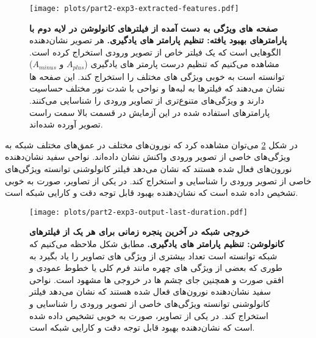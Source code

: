                 \begin{figure}[!ht]
                    \centering
                    \texttt{[image: plots/part2-exp3-extracted-features.pdf]} 
                    \captionsetup{width=.9\linewidth}
                    \caption{\textbf{  صفحه های ویژگی به دست آمده از فیلترهای کانولوشن در لایه دوم با پارامترهای بهبود یافته: تنظیم پارامتر های یادگیری.}  هر تصویر نشان‌دهنده الگوهایی است که یک فیلتر خاص از تصویر ورودی استخراج کرده است. مشاهده می‌کنیم که تنظیم درست پارمتر های یادگیری
                    ($A_{plus}$ و $A_{minus}$) 
                    توانسته است به خوبی ویژگی های مختلف را استخراج کند. 
                    این صفحه ها نشان می‌دهند که فیلترها به لبه‌ها و نواحی با شدت نور مختلف حساسیت دارند و ویژگی‌های متنوع‌تری از تصاویر ورودی را شناسایی می‌کنند. پارامترهای استفاده شده در این آزمایش در قسمت بالا سمت راست تصویر آورده شده‌اند.
                    }
                    \label{fig:part2-exp3-extracted-features}
                \end{figure}

                در شکل 
                \ref{fig:part2-exp3-output-last-duration}
                می‌توان مشاهده کرد که نورون‌های مختلف در عمق‌های مختلف شبکه به ویژگی‌های خاصی از تصویر ورودی واکنش نشان داده‌اند. نواحی سفید نشان‌دهنده نورون‌های فعال شده هستند که نشان می‌دهد فیلتر کانولوشنی توانسته ویژگی‌های خاصی از تصویر ورودی را شناسایی و استخراج کند. در یکی از تصاویر، صورت به خوبی تشخیص داده شده است که نشان‌دهنده بهبود قابل توجه دقت و کارایی شبکه است.

                \begin{figure}[!ht]
                    \centering
                    \texttt{[image: plots/part2-exp3-output-last-duration.pdf]} 
                    \captionsetup{width=.9\linewidth}
                    \caption{\textbf{ خروجی شبکه در آخرین پنجره زمانی برای هر یک از فیلترهای کانولوشن: تنظیم پارامتر های یادگیری. } مطابق شکل ملاحظه می‌کنیم که شبکه توانسته است تعداد بیشتری از ویژگی های تصاویر را یاد بگیرد به طوری که بعضی از ویژگی های چهره مانند فرم کلی یا خطوط عمودی و افقی صورت و همچنین جای چشم ها در خروجی ها مشهود است. نواحی سفید نشان‌دهنده نورون‌های فعال شده هستند که نشان می‌دهد فیلتر کانولوشنی توانسته ویژگی‌های خاصی از تصویر ورودی را شناسایی و استخراج کند. در یکی از تصاویر، صورت به خوبی تشخیص داده شده است که نشان‌دهنده بهبود قابل توجه دقت و کارایی شبکه است.
                    }
                    \label{fig:part2-exp3-output-last-duration}
                \end{figure}

